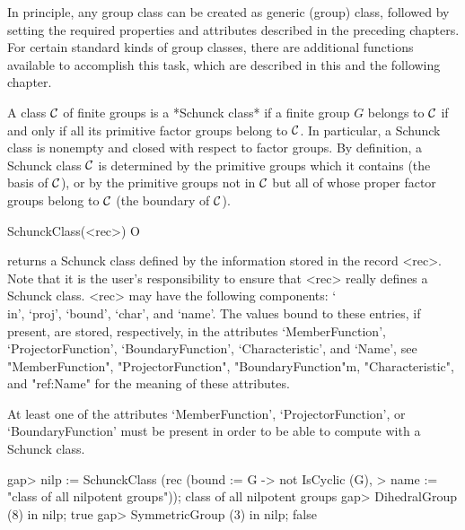 
In principle, any group class can be created as generic (group) class,
followed by setting the required properties and attributes described in the
preceding chapters. For certain standard kinds of group classes, there are additional
functions available to accomplish this task, which are described in this and the
following chapter.


\null


A class $\cal C$ of finite groups is a *Schunck class* if a finite group
$G$ belongs to $\cal C$ if and only if all its primitive factor groups
belong to $\cal C$. In particular, a Schunck class is nonempty and closed
with respect to factor groups. By definition, a Schunck class $\cal C$ is
determined by the primitive groups which it contains (the basis of $\cal C$),
or by the primitive groups not in $\cal C$ but all of whose proper factor
groups belong to $\cal C$ (the boundary of $\cal C$).

\>SchunckClass(<rec>) O

returns a Schunck class defined by the information stored in the record
<rec>. Note that it is the user's responsibility to ensure that <rec> really
defines a Schunck class. <rec> may have the following components: `\\in',
`proj', `bound', `char', and `name'. The values bound to these entries, if
present, are stored, respectively, in the attributes `MemberFunction', 
`ProjectorFunction', `BoundaryFunction', `Characteristic', and `Name', see
"MemberFunction", 
"ProjectorFunction", "BoundaryFunction"m, "Characteristic", and "ref:Name"
for the meaning of these attributes.

At least one of the attributes `MemberFunction', `ProjectorFunction', or
`BoundaryFunction' must be present in order to be able to compute
with a Schunck class. 

\beginexample
gap> nilp := SchunckClass (rec (bound := G -> not IsCyclic (G),
>        name := "class of all nilpotent groups"));
class of all nilpotent groups
gap> DihedralGroup (8) in nilp;
true
gap> SymmetricGroup (3) in nilp;
false
\endexample

